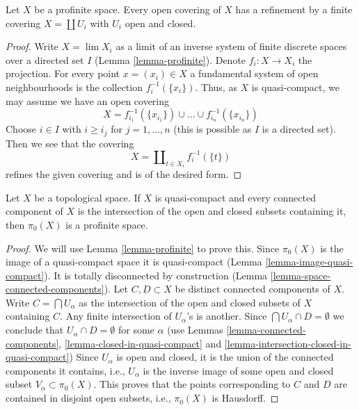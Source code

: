 \begin{lemma}
\label{lemma-profinite-refine-open-covering}
Let $X$ be a profinite space. Every open covering of $X$ has a refinement
by a finite covering $X = \coprod U_i$ with $U_i$ open and closed.
\end{lemma}

\begin{proof}
Write $X = \lim X_i$ as a limit of an inverse system of finite discrete
spaces over a directed set $I$ (Lemma \ref{lemma-profinite}).
Denote $f_i : X \to X_i$ the projection.
For every point $x = (x_i) \in X$ a fundamental system of open neighbourhoods
is the collection $f_i^{-1}(\{x_i\})$. Thus, as $X$ is quasi-compact, we may
assume we have an open covering
$$
X = f_{i_1}^{-1}(\{x_{i_1}\}) \cup \ldots \cup f_{i_n}^{-1}(\{x_{i_n}\})
$$
Choose $i \in I$ with $i \geq i_j$ for $j = 1, \ldots, n$ (this is possible
as $I$ is a directed set). Then we see
that the covering
$$
X = \coprod\nolimits_{t \in X_i} f_i^{-1}(\{t\})
$$
refines the given covering and is of the desired form.
\end{proof}

\begin{lemma}
\label{lemma-pi0-profinite}
Let $X$ be a topological space. If $X$ is quasi-compact
and every connected component of $X$ is the intersection
of the open and closed subsets containing it, then $\pi_0(X)$
is a profinite space.
\end{lemma}

\begin{proof}
We will use Lemma \ref{lemma-profinite} to prove this.
Since $\pi_0(X)$ is the image of a quasi-compact space it is
quasi-compact (Lemma \ref{lemma-image-quasi-compact}).
It is totally disconnected by construction
(Lemma \ref{lemma-space-connected-components}).
Let $C, D \subset X$ be distinct connected components of $X$.
Write $C = \bigcap U_\alpha$ as the intersection of the open and
closed subsets of $X$ containing $C$. Any finite intersection
of $U_\alpha$'s is another. Since $\bigcap U_\alpha \cap D = \emptyset$
we conclude that $U_\alpha \cap D = \emptyset$ for some $\alpha$
(use Lemmas \ref{lemma-connected-components},
\ref{lemma-closed-in-quasi-compact} and
\ref{lemma-intersection-closed-in-quasi-compact})
Since $U_\alpha$ is open and closed, it is the union of the
connected components it contains, i.e., $U_\alpha$ is the inverse
image of some open and closed subset $V_\alpha \subset \pi_0(X)$.
This proves that the points corresponding to $C$ and $D$
are contained in disjoint open subsets, i.e., $\pi_0(X)$ is
Hausdorff.
\end{proof}






